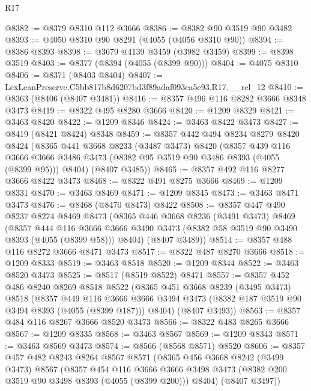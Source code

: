 \begin{lexlean}{R17}
\begin{coremodule}
@8382 := @8379 @8310 @112 @3666
@8386 := @8382 @90 @3519 @90 @3482
@8393 := @4050 @8310 @90 @8291 (@4055 (@4056 @8310 @90))
@8394 := @8386 @8393
@8398 := @3679 @4139 @3459 (@3982 @3459)
@8399 := @8398 @3519
@8403 := @8377 (@8394 (@4055 (@8399 @90)))
@8404 := @4075 @8310
@8406 := @8371 (@8403 @8404)
@8407 := LexLeanPreserve.C5bb817b8d6207bd3f89adaf093ca5e93.R17.__rel_12
@8410 := @8363 (@8406 (@8407 @3481))
@8416 := @8357 @496 @116 @8282 @3666 @8348 @3473
@8419 := @8322 @495 @8280 @3666
@8420 := @1209 @8329
@8421 := @3463 @8420
@8422 := @1209 @8346
@8424 := @3463 @8422 @3473
@8427 := @8419 (@8421 @8424) @8348
@8459 := @8357
    @442
    @494
    @8234
    @8279
    @8420
    @8424
    (@8365
      @441
      @3668
      @8233
      (@3487 @3473)
      @8420
      (@8357
        @439
        @116
        @3666
        @3666
        @3486
        @3473
        (@8382 @95 @3519 @90 @3486 @8393 (@4055 (@8399 @95)))
        @8404)
      (@8407 @3485))
@8465 := @8357 @492 @116 @8277 @3666 @8422 @3473
@8468 := @8322 @491 @8275 @3666
@8469 := @1209 @8331
@8470 := @3463 @8469
@8471 := @1209 @8345
@8473 := @3463 @8471 @3473
@8476 := @8468 (@8470 @8473) @8422
@8508 := @8357
    @447
    @490
    @8237
    @8274
    @8469
    @8473
    (@8365
      @446
      @3668
      @8236
      (@3491 @3473)
      @8469
      (@8357
        @444
        @116
        @3666
        @3666
        @3490
        @3473
        (@8382 @58 @3519 @90 @3490 @8393 (@4055 (@8399 @58)))
        @8404)
      (@8407 @3489))
@8514 := @8357 @488 @116 @8272 @3666 @8471 @3473
@8517 := @8322 @487 @8270 @3666
@8518 := @1209 @8333
@8519 := @3463 @8518
@8520 := @1209 @8344
@8522 := @3463 @8520 @3473
@8525 := @8517 (@8519 @8522) @8471
@8557 := @8357
    @452
    @486
    @8240
    @8269
    @8518
    @8522
    (@8365
      @451
      @3668
      @8239
      (@3495 @3473)
      @8518
      (@8357
        @449
        @116
        @3666
        @3666
        @3494
        @3473
        (@8382 @187 @3519 @90 @3494 @8393 (@4055 (@8399 @187)))
        @8404)
      (@8407 @3493))
@8563 := @8357 @484 @116 @8267 @3666 @8520 @3473
@8566 := @8322 @483 @8265 @3666
@8567 := @1209 @8335
@8568 := @3463 @8567
@8569 := @1209 @8343
@8571 := @3463 @8569 @3473
@8574 := @8566 (@8568 @8571) @8520
@8606 := @8357
    @457
    @482
    @8243
    @8264
    @8567
    @8571
    (@8365
      @456
      @3668
      @8242
      (@3499 @3473)
      @8567
      (@8357
        @454
        @116
        @3666
        @3666
        @3498
        @3473
        (@8382 @200 @3519 @90 @3498 @8393 (@4055 (@8399 @200)))
        @8404)
      (@8407 @3497))

\end{coremodule}
\end{lexlean}
